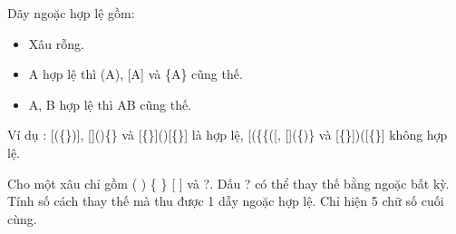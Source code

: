 Dãy ngoặc hợp lệ gồm:
\begin{itemize}
	\item Xâu rỗng.
	\item A hợp lệ thì (A), [A] và \{A\} cũng thế.
	\item A, B hợp lệ thì AB cũng thế.
\end{itemize}

Ví dụ : [(\{\})], []()\{\} và [\{\}]()[\{\}] là hợp lệ, [(\{\{([, [](\{)\} và [\{\}])([\{\}] không hợp lệ.

Cho một xâu chỉ gồm ( ) \{ \} [ ] và ?. Dấu ? có thể thay thế bằng ngoặc bất kỳ. Tính số cách thay thế mà thu được 1 dẫy ngoặc hợp lệ. Chỉ hiện 5 chữ số cuối cùng.